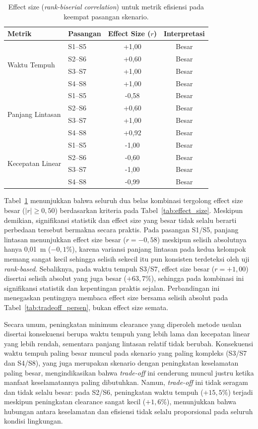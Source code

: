 \begin{table}[H]
\centering
\caption{Effect size (\textit{rank-biserial correlation}) untuk metrik
efisiensi pada keempat pasangan skenario.}
\label{tab:tradeoff_effect_size}
\begin{tabular}{llcc}
\toprule
\textbf{Metrik} & \textbf{Pasangan} & \textbf{Effect Size ($r$)} & \textbf{Interpretasi} \\
\midrule
\multirow{4}{*}{Waktu Tempuh}
 & S1--S5 & +1,00 & Besar \\
 & S2--S6 & +0,60 & Besar \\
 & S3--S7 & +1,00 & Besar \\
 & S4--S8 & +1,00 & Besar \\
\midrule
\multirow{4}{*}{Panjang Lintasan}
 & S1--S5 & -0,58 & Besar \\
 & S2--S6 & +0,60 & Besar \\
 & S3--S7 & +1,00 & Besar \\
 & S4--S8 & +0,92 & Besar \\
\midrule
\multirow{4}{*}{Kecepatan Linear}
 & S1--S5 & -1,00 & Besar \\
 & S2--S6 & -0,60 & Besar \\
 & S3--S7 & -1,00 & Besar \\
 & S4--S8 & -0,99 & Besar \\
\bottomrule
\end{tabular}
\end{table}

Tabel~\ref{tab:tradeoff_effect_size} menunjukkan bahwa seluruh dua belas
kombinasi tergolong effect size besar ($|r| \geq 0,50$) berdasarkan kriteria
pada Tabel~\ref{tab:effect_size}. Meskipun demikian, signifikansi statistik
dan effect size yang besar tidak selalu berarti perbedaan tersebut bermakna
secara praktis. Pada pasangan S1/S5, panjang lintasan menunjukkan effect
size besar ($r=-0,58$) meskipun selisih absolutnya hanya 0,01~m ($-0,1\%$),
karena variansi panjang lintasan pada kedua kelompok memang sangat kecil
sehingga selisih sekecil itu pun konsisten terdeteksi oleh uji
\textit{rank-based}. Sebaliknya, pada waktu tempuh S3/S7, effect size besar
($r=+1,00$) disertai selisih absolut yang juga besar ($+63,7\%$), sehingga
pada kombinasi ini signifikansi statistik dan kepentingan praktis sejalan.
Perbandingan ini menegaskan pentingnya membaca effect size bersama selisih
absolut pada Tabel~\ref{tab:tradeoff_persen}, bukan effect size semata.

Secara umum, peningkatan minimum clearance yang diperoleh metode usulan
disertai konsekuensi berupa waktu tempuh yang lebih lama dan kecepatan
linear yang lebih rendah, sementara panjang lintasan relatif tidak berubah.
Konsekuensi waktu tempuh paling besar muncul pada skenario yang paling
kompleks (S3/S7 dan S4/S8), yang juga merupakan skenario dengan peningkatan
keselamatan paling besar, mengindikasikan bahwa \textit{trade-off} ini
cenderung muncul justru ketika manfaat keselamatannya paling dibutuhkan.
Namun, \textit{trade-off} ini tidak seragam dan tidak selalu besar: pada
S2/S6, peningkatan waktu tempuh ($+15,5\%$) terjadi meskipun peningkatan
clearance sangat kecil ($+1,6\%$), menunjukkan bahwa hubungan antara
keselamatan dan efisiensi tidak selalu proporsional pada seluruh kondisi
lingkungan.

